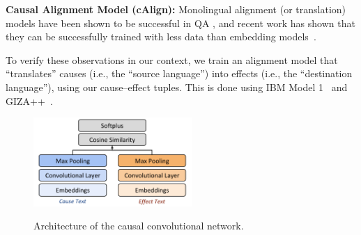 {\flushleft \textbf{Causal Alignment Model (cAlign):}}
Monolingual alignment (or translation) models have been shown to be successful in QA \cite{Berger:00,Echihabi:03,Soricut:06,Riezler:etal:2007,Surdeanu:11,yao2013}, and recent work has shown that they can be successfully trained with less data than embedding models~\cite{sharp2015spinning}. 

To verify these observations in our context, we train an alignment model that ``translates'' causes (i.e., the ``source language'') into effects (i.e., the ``destination language''), using our cause--effect tuples. 
This is done using IBM Model 1~\cite{Brown:93} and GIZA++~\cite{och03}. 


\begin{figure}[t!]
\begin{center}
\includegraphics[width=60mm]{cnn2.png}
\vspace{-2mm}
\caption{{\footnotesize Architecture of the causal convolutional network. }}
\vspace{-6mm}
\label{fig:cnn}
\end{center}
\end{figure}

